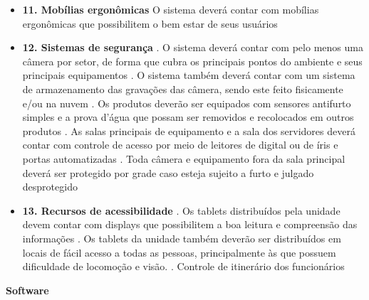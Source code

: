 \begin{itemize}[label={}]
	\item \textbf{11. Mobílias ergonômicas}
		 O sistema deverá contar com mobílias ergonômicas que possibilitem o bem estar de seus usuários
	\item \textbf{12. Sistemas de segurança}
		. O sistema deverá contar com pelo menos uma câmera por setor, de forma que cubra os principais pontos do ambiente e seus principais equipamentos
		. O sistema também deverá contar com um sistema de armazenamento das gravações das câmera, sendo este feito fisicamente e/ou na nuvem 
		. Os produtos deverão ser equipados com sensores antifurto simples e a prova d'água que possam ser removidos e recolocados em outros produtos
		. As salas principais de equipamento e a sala dos servidores deverá contar com controle de acesso por meio de leitores de digital ou de íris e portas automatizadas
		. Toda câmera e equipamento fora da sala principal deverá ser protegido por grade caso esteja sujeito a furto e julgado desprotegido 
	\item \textbf{13. Recursos de acessibilidade}
		. Os tablets distribuídos pela unidade devem contar com displays que possibilitem a boa leitura e compreensão das informações
		. Os tablets da unidade também deverão ser distribuídos em locais de fácil acesso a todas as pessoas, principalmente às que possuem dificuldade de locomoção e visão. 
		. Controle de itinerário dos funcionários 
\end{itemize}
\textbf{Software}
